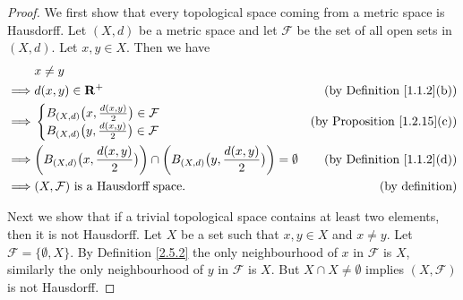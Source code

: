 \begin{proof}
    We first show that every topological space coming from a metric space is Hausdorff.
    Let \((X, d)\) be a metric space and let \(\mathcal{F}\) be the set of all open sets in \((X, d)\).
    Let \(x, y \in X\).
    Then we have
    \begin{align*}
                 & x \neq y                                                                                                                                                           \\
        \implies & d(x, y) \in \mathbf{R}^+                                                                                                   & \text{(by Definition \ref{1.1.2}(b))} \\
        \implies & \begin{cases}
                       B_{(X, d)}\big(x, \frac{d(x, y)}{2}\big) \in \mathcal{F} \\
                       B_{(X, d)}\big(y, \frac{d(x, y)}{2}\big) \in \mathcal{F}
                   \end{cases}                                                          & \text{(by Proposition \ref{1.2.15}(c))}                                                     \\
        \implies & \bigg(B_{(X, d)}\big(x, \frac{d(x, y)}{2}\big)\bigg) \cap \bigg(B_{(X, d)}\big(y, \frac{d(x, y)}{2}\big)\bigg) = \emptyset & \text{(by Definition \ref{1.1.2}(d))} \\
        \implies & (X, \mathcal{F}) \text{ is a Hausdorff space}.                                                                             & \text{(by definition)}
    \end{align*}

    Next we show that if a trivial topological space contains at least two elements, then it is not Hausdorff.
    Let \(X\) be a set such that \(x, y \in X\) and \(x \neq y\).
    Let \(\mathcal{F} = \{\emptyset, X\}\).
    By Definition \ref{2.5.2} the only neighbourhood of \(x\) in \(\mathcal{F}\) is \(X\), similarly the only neighbourhood of \(y\) in \(\mathcal{F}\) is \(X\).
    But \(X \cap X \neq \emptyset\) implies \((X, \mathcal{F})\) is not Hausdorff.


\end{proof}
